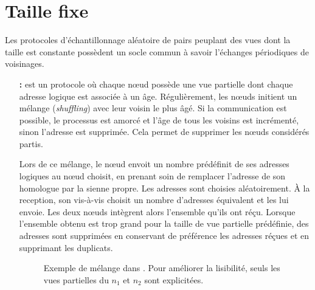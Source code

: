 

\section{Taille fixe}

Les protocoles d'échantillonnage aléatoire de pairs peuplant des vues dont la
taille est constante possèdent un socle commun à savoir l'échanges périodiques
de voisinages.

\begin{itemize}
\item [\textbf{\CYCLON :}] est un protocole où chaque nœud possède une vue
  partielle dont chaque adresse logique est associée à un âge. Régulièrement,
  les nœuds initient un mélange (\emph{shuffling}) avec leur voisin le plus
  âgé. Si la communication est possible, le processus est amorcé et l'âge de
  tous les voisins est incrémenté, sinon l'adresse est supprimée. Cela permet de
  supprimer les nœuds considérés partis.

  Lors de ce mélange, le nœud envoit un nombre prédéfinit de ses adresses
  logiques au nœud choisit, en prenant soin de remplacer l'adresse de son
  homologue par la sienne propre. Les adresses sont choisies aléatoirement. À la
  reception, son vis-à-vis choisit un nombre d'adresses équivalent et les lui
  envoie. Les deux nœuds intègrent alors l'ensemble qu'ils ont réçu. Lorsque
  l'ensemble obtenu est trop grand pour la taille de vue partielle prédéfinie,
  des adresses sont supprimées en conservant de préférence les adresses réçues
  et en supprimant les duplicats.
  
  \begin{figure}
    \centering
    \hspace{35pt}
    \caption{\label{net:fig:cyclonexample} Exemple de mélange dans \CYCLON. Pour
      améliorer la lisibilité, seuls les vues partielles du $n_1$ et $n_2$ sont
      explicitées.}
  \end{figure}
  

\end{itemize}
